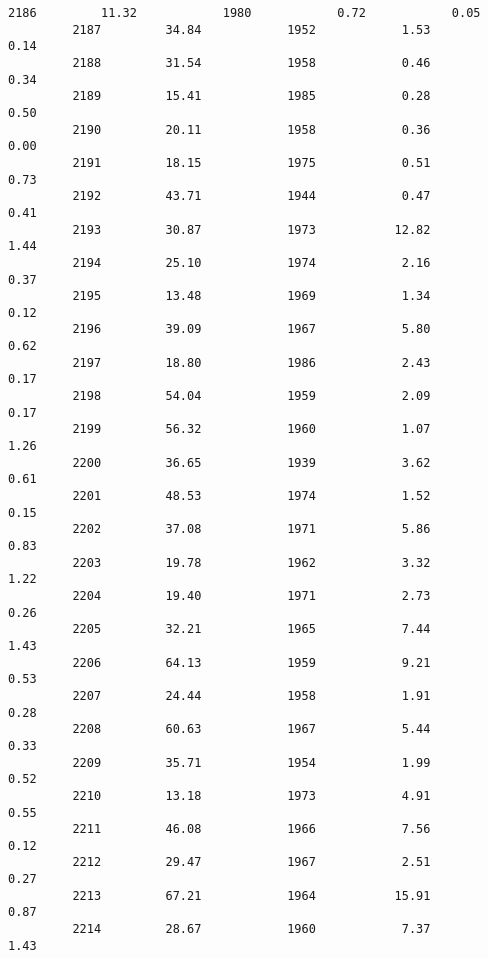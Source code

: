 \documentclass[11pt]{llncs}
\begin{document}
\begin{Verbatim}[commandchars=\\\{\}]
         2186         11.32            1980            0.72            0.05   
         2187         34.84            1952            1.53            0.14   
         2188         31.54            1958            0.46            0.34   
         2189         15.41            1985            0.28            0.50   
         2190         20.11            1958            0.36            0.00   
         2191         18.15            1975            0.51            0.73   
         2192         43.71            1944            0.47            0.41   
         2193         30.87            1973           12.82            1.44   
         2194         25.10            1974            2.16            0.37   
         2195         13.48            1969            1.34            0.12   
         2196         39.09            1967            5.80            0.62   
         2197         18.80            1986            2.43            0.17   
         2198         54.04            1959            2.09            0.17   
         2199         56.32            1960            1.07            1.26   
         2200         36.65            1939            3.62            0.61   
         2201         48.53            1974            1.52            0.15   
         2202         37.08            1971            5.86            0.83   
         2203         19.78            1962            3.32            1.22   
         2204         19.40            1971            2.73            0.26   
         2205         32.21            1965            7.44            1.43   
         2206         64.13            1959            9.21            0.53   
         2207         24.44            1958            1.91            0.28   
         2208         60.63            1967            5.44            0.33   
         2209         35.71            1954            1.99            0.52   
         2210         13.18            1973            4.91            0.55   
         2211         46.08            1966            7.56            0.12   
         2212         29.47            1967            2.51            0.27   
         2213         67.21            1964           15.91            0.87   
         2214         28.67            1960            7.37            1.43   
         

\end{Verbatim}
\end{document}
